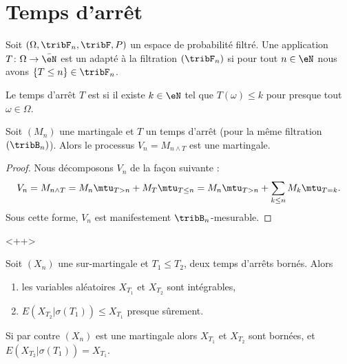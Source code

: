 \section{Temps d'arrêt}

\begin{definition}
    Soit \( (\Omega,\tribF_n,\tribF,P)\) un espace de probabilité filtré. Une application \( T\colon \Omega\to \bar \eN\) est un  adapté à la filtration \( (\tribF_n)\) si pour tout \( n\in \eN\) nous avons \( \{ T\leq n \}\in\tribF_n\).

    Le temps d'arrêt $T$ est  si il existe \( k\in \eN\) tel que \( T(\omega)\leq k\) pour presque tout \( \omega\in \Omega\).
\end{definition}

\begin{proposition}
    Soit \( (M_n)\) une martingale et \( T\) un temps d'arrêt (pour la même filtration \( (\tribB_n)\)). Alors le processus \( V_n=M_{n\wedge T}\) est une martingale.
\end{proposition}

\begin{proof}
    Nous décomposons \( V_n\) de la façon suivante :
    \begin{equation}
        V_n=M_{n\wedge T}=M_n\mtu_{T>n}+M_T\mtu_{T\leq n}=M_n\mtu_{T>n}+\sum_{k\leq n}M_k\mtu_{T=k}.
    \end{equation}
    Sous cette forme, \( V_n\) est manifestement \( \tribB_n\)-mesurable.
\end{proof}
<++>

\begin{theorem}
    Soit \( (X_n)\) une sur-martingale et \( T_1\leq T_2\), deux temps d'arrêts bornés. Alors
    \begin{enumerate}
        \item
            les variables aléatoires \( X_{T_1}\) et \( X_{T_2}\) sont intégrables,
        \item
            \( E(X_{T_2}|  \sigma(T_1) )\leq X_{T_1}\) presque sûrement.
    \end{enumerate}
    Si par contre \( (X_n)\) est une martingale alors \( X_{T_1}\) et \( X_{T_2}\) sont bornées, et \( E(X_{T_2}|\sigma(T_1))=X_{T_1}\).
\end{theorem}

